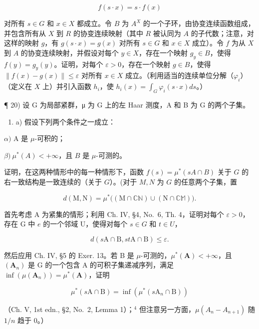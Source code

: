 \[
f (s \cdot x) = s \cdot f (x)
\]

对所有 \(s \in G\) 和 \(x \in X\) 都成立。令 \(B\) 为 \(A^X\) 的一个子环，由协变连续函数组成，并包含所有从 \(X\) 到 \(R\) 的协变连续映射（其中 \(R\) 被认同为 \(A\) 的子代数；注意，对这样的映射 \(g\)，有 \(g(s \cdot x) = g(x)\) 对所有 \(s \in G\) 和 \(x \in X\) 成立）。令 \(f\) 为从 \(X\) 到 \(A\) 的协变连续映射，并假设对每个 \(y \in X\)，存在一个映射 \(g_y \in B\)，使得 \(f(y) = g_y(y)\)。证明，对每个 \(\varepsilon > 0\)，存在一个映射 \(g \in B\)，使得 \(\|f(x) - g(x)\| \leqslant \varepsilon\) 对所有 \(x \in X\) 成立。（利用适当的连续单位分解（\(\varphi_i\)）（定义在 \(X\) 上）并引入函数 \(h_i\)，使 \(h_i(x) = \int_G \varphi_i(s \cdot x) ds\)。）

¶ 20) 设 G 为局部紧群，μ 为 G 上的左 Haar 测度，A 和 B 为 G 的两个子集。

\begin{enumerate}
\def\labelenumi{\alph{enumi})}
\tightlist
\item
  a) 假设下列两个条件之一成立：
\end{enumerate}

\(\alpha)\) A 是 \(\mu\)-可积的；

\(\beta)\ \mu^{*}(A) < +\infty\)，且 \(B\) 是 \(\mu\)-可测的。

证明，在这两种情形中的每一种情形下，函数 \(f(s) = \mu^{*}(sA \cap B)\) 关于 \(G\) 的右一致结构是一致连续的（关于 \(G\)）。(对于 \(M, N\) 为 \(G\) 的任意两个子集，置

\[
d (\mathrm{M}, \mathrm{N}) = \mu^ {*} \big ((\mathrm{M} \cap \mathbb {C N}) \cup (\mathrm{N} \cap \mathbb {C M}) \big).
\]

首先考虑 A 为紧集的情形；利用 Ch. IV, §4, No.~6, Th. 4，证明对每个 \(\varepsilon > 0\)，存在 G 中 \(e\) 的一个邻域 U，使得对每个 \(s \in G\) 和 \(t \in U\)，

\[
d (s \mathrm{A} \cap \mathrm{B}, s t \mathrm{A} \cap \mathrm{B}) \leqslant \varepsilon .
\]

然后应用 Ch. IV, §5 的 Exer. 13。若 B 是 \(\mu\)-可测的，\(\mu^{*}(\mathbf{A}) < +\infty\)，且 \((\mathbf{A}_{n})\) 是 G 的一个包含 A 的可积子集递减序列，满足 \(\inf (\mu (\mathbf{A}_n)) = \mu^{*}(\mathbf{A})\)，证明

\[
\mu^ {*} (s \mathrm{A} \cap \mathrm{B}) = \inf \left(\mu^ {*} (s \mathrm{A} _ {n} \cap \mathrm{B})\right)
\]

（Ch. V, 1st edn., §2, No.~2, Lemma 1）；\(^{4}\) 但注意另一方面，\(\mu(A_{n}-A_{n+1})\) 随 \(1/n\) 趋于 0。）

